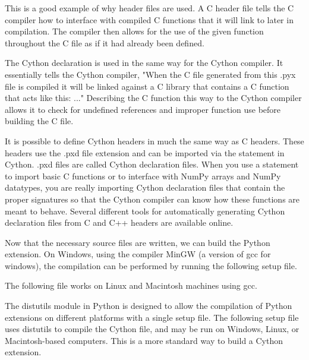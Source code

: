 \begin{info}
This is a good example of why header files are used.
A C header file tells the C compiler how to interface with compiled C functions that it will link to later in compilation.
The compiler then allows for the use of the given function throughout the C file as if it had already been defined.

The Cython  declaration is used in the same way for the Cython compiler.
It essentially tells the Cython compiler, "When the C file generated from this .pyx file is compiled it will be linked against a C library that contains a C function that acts like this: ..."
Describing the C function this way to the Cython compiler allows it to check for undefined references and improper function use before building the C file.

It is possible to define Cython headers in much the same way as C headers.
These headers use the .pxd file extension and can be imported via the  statement in Cython.
.pxd files are called Cython declaration files.
When you use a  statement to import basic C functions or to interface with NumPy arrays and NumPy datatypes, you are really importing Cython declaration files that contain the proper signatures so that the Cython compiler can know how these functions are meant to behave.
Several different tools for automatically generating Cython declaration files from C and C++ headers are available online.
\end{info}

Now that the necessary source files are written, we can build the Python extension.
On Windows, using the compiler MinGW (a version of gcc for windows), the compilation can be performed by running the following setup file.



The following file works on Linux and Macintosh machines using gcc.



The distutils module in Python is designed to allow the compilation of Python extensions on different platforms with a single setup file.
The following setup file uses distutils to compile the Cython file, and may be run on Windows, Linux, or Macintosh-based computers.
This is a more standard way to build a Cython extension.

